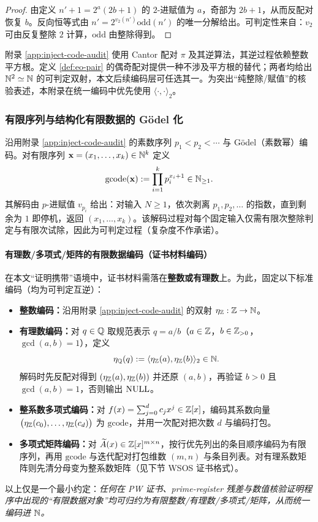 \begin{proof}
由定义 $n'+1=2^a(2b+1)$ 的 $2$-进赋值为 $a$，奇部为 $2b+1$，从而反配对恢复 $b$。反向恒等式由 $n'=2^{v_2(n')}\mathrm{odd}(n')$ 的唯一分解给出。可判定性来自：$v_2$ 可由反复整除 $2$ 计算，$\mathrm{odd}$ 由整除得到。
\end{proof}

\begin{remark}
附录 \ref{app:inject-code-audit} 使用 Cantor 配对 $\pi$ 及其逆算法，其逆过程依赖整数平方根。定义 \ref{def:eo-pair} 的偶奇配对提供一种不涉及平方根的替代；两者均给出 $\mathbb{N}^2\simeq\mathbb{N}$ 的可判定双射，本文后续编码层可任选其一。为突出“纯整除/赋值”的核验表述，本附录在统一编码中优先使用 $\langle\cdot,\cdot\rangle_2$。
\end{remark}

\subsubsection{有限序列与结构化有限数据的 Gödel 化}

沿用附录 \ref{app:inject-code-audit} 的素数序列 $p_1<p_2<\cdots$ 与 Gödel（素数幂）编码。对有限序列 $\mathbf{x}=(x_1,\dots,x_k)\in\mathbb{N}^k$ 定义
$$
\mathrm{gcode}(\mathbf{x}) := \prod_{i=1}^{k} p_i^{x_i+1}\in\mathbb{N}_{\ge 1}.
$$
其解码由 $p$-进赋值 $v_{p_i}$ 给出：对输入 $N\ge 1$，依次剥离 $p_1,p_2,\dots$ 的指数，直到剩余为 $1$ 即停机，返回 $(x_1,\dots,x_k)$。该解码过程对每个固定输入仅需有限次整除判定与有限次试除，因此为可判定过程（复杂度不作承诺）。

\paragraph{有理数/多项式/矩阵的有限数据编码（证书材料编码）}
在本文“证明携带”语境中，证书材料需落在\textbf{整数或有理数}上。为此，固定以下标准编码（均为可判定互逆）：
\begin{itemize}
  \item \textbf{整数编码：}沿用附录 \ref{app:inject-code-audit} 的双射 $\eta_{\mathbb{Z}}:\mathbb{Z}\to\mathbb{N}$。
  \item \textbf{有理数编码：}对 $q\in\mathbb{Q}$ 取规范表示 $q=a/b$（$a\in\mathbb{Z}$，$b\in\mathbb{Z}_{>0}$，$\gcd(a,b)=1$），定义
  $$
  \eta_{\mathbb{Q}}(q):=\langle \eta_{\mathbb{Z}}(a),\eta_{\mathbb{Z}}(b)\rangle_2\in\mathbb{N}.
  $$
  解码时先反配对得到 $(\eta_{\mathbb{Z}}(a),\eta_{\mathbb{Z}}(b))$ 并还原 $(a,b)$，再验证 $b>0$ 且 $\gcd(a,b)=1$，否则输出 $\mathrm{NULL}$。
  \item \textbf{整系数多项式编码：}对 $f(x)=\sum_{j=0}^{d} c_j x^j\in\mathbb{Z}[x]$，编码其系数向量 $\bigl(\eta_{\mathbb{Z}}(c_0),\dots,\eta_{\mathbb{Z}}(c_d)\bigr)$ 为 $\mathrm{gcode}$，并用一次配对把次数 $d$ 与编码打包。
  \item \textbf{多项式矩阵编码：}对 $\widetilde{A}(x)\in\mathbb{Z}[x]^{m\times n}$，按行优先列出的条目顺序编码为有限序列，再用 $\mathrm{gcode}$ 与迭代配对打包维数 $(m,n)$ 与条目列表。对有理系数矩阵则先清分母变为整系数矩阵（见下节 WSOS 证书格式）。
\end{itemize}
以上仅是一个最小约定：\emph{任何在 PW 证书、prime-register 残差与数值核验证明程序中出现的“有限数据对象”均可归约为有限整数/有理数/多项式/矩阵，从而统一编码进 $\mathbb{N}$。}

